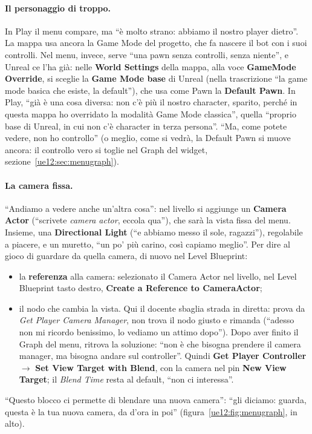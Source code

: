 \paragraph{Il personaggio di troppo.} In Play il menu compare, ma ``è molto strano:
abbiamo il nostro player dietro''. La mappa usa ancora la Game Mode del progetto, che fa
nascere il bot con i suoi controlli. Nel menu, invece, serve ``una pawn senza controlli,
senza niente'', e Unreal ce l'ha già: nelle \textbf{World Settings} della mappa, alla voce
\textbf{GameMode Override}, si sceglie la \textbf{Game Mode base} di Unreal (nella
trascrizione ``la game mode basica che esiste, la default''), che usa come Pawn la
\textbf{Default Pawn}. In Play, ``già è una cosa diversa: non c'è più il nostro character,
sparito, perché in questa mappa ho overridato la modalità Game Mode classica'', quella
``proprio base di Unreal, in cui non c'è character in terza persona''. ``Ma, come potete
vedere, non ho controllo'' (o meglio, come si vedrà, la Default Pawn si muove ancora:
il controllo vero si toglie nel Graph del widget, sezione~\ref{ue12:sec:menugraph}).

\paragraph{La camera fissa.} ``Andiamo a vedere anche un'altra cosa'': nel livello si
aggiunge un \textbf{Camera Actor} (``scrivete \emph{camera actor}, eccola qua''), che sarà
la vista fissa del menu. Insieme, una \textbf{Directional Light} (``e abbiamo messo il
sole, ragazzi''), regolabile a piacere, e un muretto, ``un po' più carino, così capiamo
meglio''. Per dire al gioco di guardare da quella camera, di nuovo nel Level Blueprint:
\begin{itemize}
  \item la \textbf{referenza} alla camera: selezionato il Camera Actor nel livello, nel
        Level Blueprint tasto destro, \textbf{Create a Reference to CameraActor};
  \item il nodo che cambia la vista. Qui il docente sbaglia strada in diretta: prova da
        \emph{Get Player Camera Manager}, non trova il nodo giusto e rimanda (``adesso non
        mi ricordo benissimo, lo vediamo un attimo dopo''). Dopo aver finito il Graph del
        menu, ritrova la soluzione: ``non è che bisogna prendere il camera manager, ma
        bisogna andare sul controller''. Quindi \textbf{Get Player Controller}
        $\rightarrow$ \textbf{Set View Target with Blend}, con la camera nel pin
        \textbf{New View Target}; il \emph{Blend Time} resta al default, ``non ci
        interessa''.
\end{itemize}
``Questo blocco ci permette di blendare una nuova camera'': ``gli diciamo: guarda, questa
è la tua nuova camera, da d'ora in poi'' (figura~\ref{ue12:fig:menugraph}, in alto).

